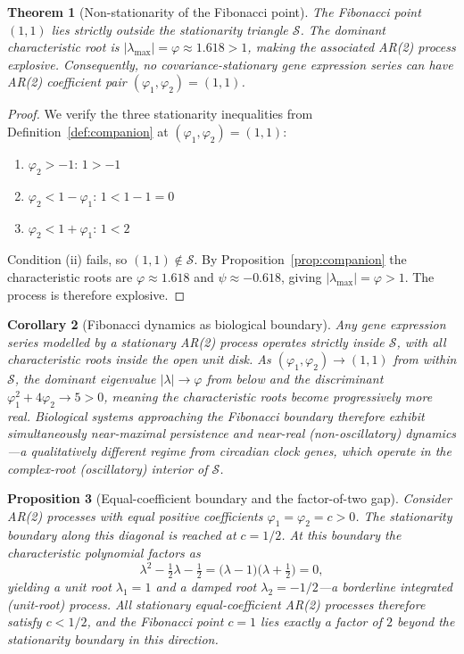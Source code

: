 \documentclass[11pt,letterpaper]{article}
\newtheorem{theorem}{Theorem}[section]
\newtheorem{proposition}[theorem]{Proposition}
\newtheorem{corollary}[theorem]{Corollary}
\theoremstyle{definition}
\theoremstyle{remark}
\begin{document}
\begin{theorem}[Non-stationarity of the Fibonacci point]\label{thm:nonstationarity}
The Fibonacci point $(1, 1)$ lies strictly outside the stationarity triangle $\mathcal{S}$. The dominant characteristic root is $|\lambda_{\max}| = \varphi \approx 1.618 > 1$, making the associated AR(2) process explosive. Consequently, no covariance-stationary gene expression series can have AR(2) coefficient pair $(\varphi_1, \varphi_2) = (1, 1)$.
\end{theorem}

\begin{proof}
We verify the three stationarity inequalities from Definition~\ref{def:companion} at $(\varphi_1,\varphi_2) = (1,1)$:
\begin{enumerate}
  \item $\varphi_2 > -1$: \quad $1 > -1$ \quad \checkmark
  \item $\varphi_2 < 1 - \varphi_1$: \quad $1 < 1 - 1 = 0$ \quad \texttimes
  \item $\varphi_2 < 1 + \varphi_1$: \quad $1 < 2$ \quad \checkmark
\end{enumerate}
Condition (ii) fails, so $(1,1)\notin\mathcal{S}$. By Proposition~\ref{prop:companion} the characteristic roots are $\varphi\approx 1.618$ and $\psi\approx -0.618$, giving $|\lambda_{\max}| = \varphi > 1$. The process is therefore explosive.
\end{proof}

\begin{corollary}[Fibonacci dynamics as biological boundary]\label{cor:boundary}
Any gene expression series modelled by a stationary AR(2) process operates strictly inside $\mathcal{S}$, with all characteristic roots inside the open unit disk. As $(\varphi_1, \varphi_2) \to (1,1)$ from within $\mathcal{S}$, the dominant eigenvalue $|\lambda|\to\varphi$ from below and the discriminant $\varphi_1^2 + 4\varphi_2\to 5 > 0$, meaning the characteristic roots become progressively more real. Biological systems approaching the Fibonacci boundary therefore exhibit simultaneously near-maximal persistence \emph{and} near-real (non-oscillatory) dynamics---a qualitatively different regime from circadian clock genes, which operate in the complex-root (oscillatory) interior of $\mathcal{S}$.
\end{corollary}

\begin{proposition}[Equal-coefficient boundary and the factor-of-two gap]\label{prop:equalcoeff}
Consider AR(2) processes with equal positive coefficients $\varphi_1 = \varphi_2 = c > 0$. The stationarity boundary along this diagonal is reached at $c = 1/2$. At this boundary the characteristic polynomial factors as
\[
  \lambda^2 - \tfrac{1}{2}\lambda - \tfrac{1}{2} = \bigl(\lambda - 1\bigr)\bigl(\lambda + \tfrac{1}{2}\bigr) = 0,
\]
yielding a unit root $\lambda_1 = 1$ and a damped root $\lambda_2 = -1/2$---a borderline integrated (unit-root) process. All stationary equal-coefficient AR(2) processes therefore satisfy $c < 1/2$, and the Fibonacci point $c=1$ lies exactly a factor of $2$ beyond the stationarity boundary in this direction.
\end{proposition}
\end{document}
